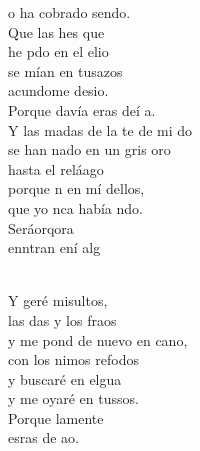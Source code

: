 \documentclass[12pt]{article}
\begin{document}
\begin{multicols*}{2}
\begin{cancion}
	o ha cobrado sendo.\\
	Que las hes que \\
	he pdo en el elio\\
	se mían en tusazos\\
	acundome desio. \\
	Porque davía eras deí a.\\
	Y las madas de la te de mi do\\
	se han nado en un gris oro\\
	hasta el reláago\\
	porque n en mí dellos,\\
	que yo nca había ndo.\\
	Seráorqora \\
	enntran ení alg\\\jump\\
	\begin{chorus}%
	Y geré misultos,\\
	las das y los fraos\\
	y me pond de nuevo en cano, \\
	con los nimos refodos\\
	y  buscaré en elgua\\
	y me oyaré en tussos.\\
	Porque lamente   \\
	esras de  ao.\\
	\end{chorus}%
	\jump\\
\end{cancion}%


\end{multicols*}
\end{document}
